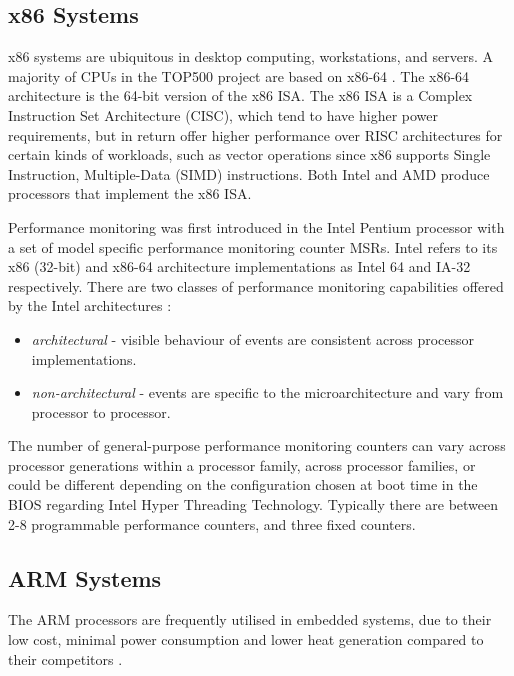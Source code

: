 {\subsection{x86 Systems}

x86 systems are ubiquitous in desktop computing, workstations, and servers. A majority of CPUs in the TOP500 project are based on x86-64 \cite{SiteTop500Project}. The x86-64 architecture is the 64-bit version of the x86 ISA. The x86 ISA is a Complex Instruction Set Architecture (CISC), which tend to have higher power requirements, but in return offer higher performance over RISC architectures for certain kinds of workloads, such as vector operations since x86 supports Single Instruction, Multiple-Data (SIMD) instructions. Both Intel and AMD produce processors that implement the x86 ISA.

Performance monitoring was first introduced in the Intel Pentium processor with a set of model specific performance monitoring counter MSRs. Intel refers to its x86 (32-bit) and x86-64 architecture implementations as Intel 64 and IA-32 respectively. There are two classes of performance monitoring capabilities offered by the Intel architectures \cite{DocsIntel64IA32Vol3B}:
\begin{itemize}
    \item \textit{architectural} - visible behaviour of events are consistent across processor implementations.
    \item \textit{non-architectural} - events are specific to the microarchitecture and vary from processor to processor.
\end{itemize}

The number of general-purpose performance monitoring counters can vary across processor generations within a processor family, across processor families, or could be different depending on the configuration chosen at boot time in the BIOS regarding Intel Hyper Threading Technology. Typically there are between 2-8 programmable performance counters, and three fixed counters.

\subsection{ARM Systems}

The ARM processors are frequently utilised in embedded systems, due to their low cost, minimal power consumption and lower heat generation compared to their competitors \cite{ArticleEmbeddedTwoPercSol}.

}
